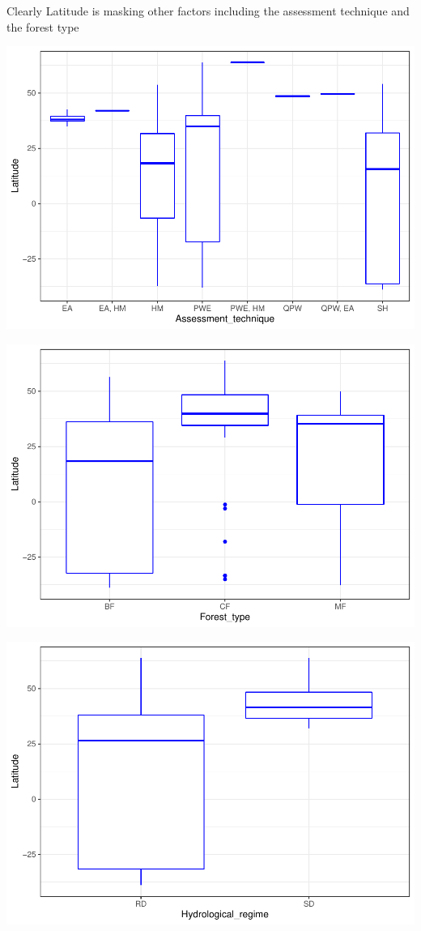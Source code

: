 \documentclass[]{elsarticle} %
\begin{document}
Clearly Latitude is masking other factors including the assessment
technique and the forest type

\includegraphics{Forest_and_Water_files/figure-latex/unnamed-chunk-18-1.pdf}

\includegraphics{Forest_and_Water_files/figure-latex/unnamed-chunk-19-1.pdf}

\includegraphics{Forest_and_Water_files/figure-latex/unnamed-chunk-20-1.pdf}
\end{document}
